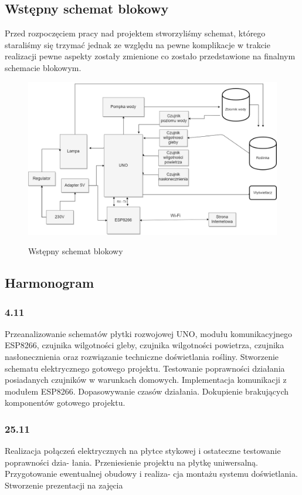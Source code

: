 \documentclass[12pt]{article}
\begin{document}
\subsection{Wstępny schemat blokowy}
Przed rozpoczęciem pracy nad projektem stworzyliśmy schemat, którego staraliśmy się trzymać jednak ze względu na pewne komplikacje w trakcie realizacji pewne aspekty zostały zmienione co zostało przedstawione na finalnym schemacie blokowym.
\begin{figure}[!h]
	\begin{center}
		{\includegraphics[width=16cm]{schemat_blokowy.png}}
	\end{center}
	\caption{Wstępny schemat blokowy}
\end{figure}

\subsection{Harmonogram}
\subsubsection{4.11}
Przeanalizowanie schematów płytki rozwojowej UNO, modułu komunikacyjnego ESP8266, czujnika wilgotności gleby, czujnika wilgotności powietrza, czujnika nasłonecznienia oraz rozwiązanie techniczne doświetlania rośliny. Stworzenie schematu elektrycznego gotowego projektu. Testowanie poprawności działania posiadanych czujników w warunkach domowych. Implementacja komunikacji z modułem ESP8266. Dopasowywanie czasów działania. 
Dokupienie brakujących komponentów gotowego projektu. 
\subsubsection{25.11}
Realizacja połączeń elektrycznych na płytce stykowej i ostateczne testowanie poprawności dzia-
łania. Przeniesienie projektu na płytkę uniwersalną. Przygotowanie ewentualnej obudowy i realiza-
cja montażu systemu doświetlania. Stworzenie prezentacji na zajęcia
\end{document}
